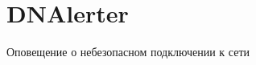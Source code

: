 \chapter{DNAlerter}
\hypertarget{md__r_e_a_d_m_e}{}\label{md__r_e_a_d_m_e}
\label{md__r_e_a_d_m_e_autotoc_md0}%
%


Оповещение о небезопасном подключении к сети 